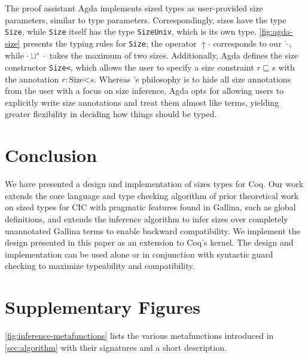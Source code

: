 \documentclass[nonacm,screen,10pt]{acmart}
\begin{document}


The proof assistant Agda implements sized types as user-provided size parameters, similar to type parameters. Correspondingly, sizes have the type \texttt{Size}, while \texttt{Size} itself has the type \texttt{SizeUniv}, which is its own type. \autoref{fig:agda-size} presents the typing rules for \texttt{Size}; the operator $\uparrow \cdot$ corresponds to our $\hat{\cdot}$, while $\cdot \sqcup^s \cdot$ takes the maximum of two sizes. Additionally, Agda defines the size constructor \texttt{Size<}, which allows the user to specify a size constraint $r \sqsubseteq s$ with the annotation $r: \text{Size<} s$. Whereas \CIChat$ $'s philosophy is to hide all size annotations from the user with a focus on size inference, Agda opts for allowing users to explicitly write size annotations and treat them almost like terms, yielding greater flexibility in deciding how things should be typed.

\section{Conclusion}
\label{sec:conclusion}
We have presented a design and implementation of sizes types for Coq.
Our work extends the core language and type checking algorithm of prior theoretical work on sized types for CIC with pragmatic features found in Gallina, such as global definitions, and extends the inference algorithm to infer sizes over completely unannotated Gallina terms to enable backward compatibility. We implement the design presented in this paper as an extension to Coq's kernel\cite{impl}. The design and implementation can be used alone or in conjunction with syntactic guard checking to maximize typeability and compatibility.




\clearpage

\appendix

\section{Supplementary Figures}\label{sec:figures}



\autoref{fig:inference-metafunctions} lists the various metafunctions introduced in \autoref{sec:algorithm} with their signatures and a short description.
\end{document}

